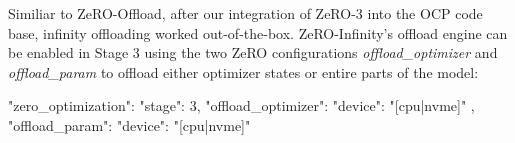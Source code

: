 Similiar to ZeRO-Offload, after our integration of ZeRO-3 into the OCP 
code base, infinity offloading worked out-of-the-box. ZeRO-Infinity's
offload engine can be enabled in Stage 3 using the two ZeRO configurations 
\textit{offload\_optimizer} and \textit{offload\_param} to offload 
either optimizer states or entire parts of the model:

\begin{json}
{
    "zero_optimization": {
        "stage": 3,
        "offload_optimizer": {
            "device": "[cpu|nvme]"
        },
        "offload_param": {
            "device": "[cpu|nvme]"
        }
    }
}
\end{json}